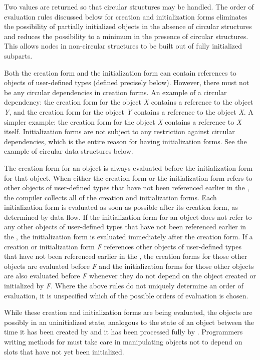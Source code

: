 \begin{newer}
\begin{defun}
  Two values are returned so that circular structures may be handled.
  The order of evaluation rules discussed below
  for creation and initialization forms
  eliminates the possibility of partially initialized objects in the
  absence of circular structures and reduces the possibility to a minimum
  in the presence of circular structures.  This allows nodes in
  non-circular structures to be built out of fully initialized subparts.

  Both the creation form and the initialization form can contain
  references to objects of user-defined types (defined precisely below).
  However, there must not be any circular dependencies in creation forms.
  An example of a circular dependency: the creation form for the
  object \emph{X\/} contains a reference to the object \emph{Y\/}, and the creation form
  for the object \emph{Y\/} contains a reference to the object \emph{X\/}.  A simpler
  example: the creation form for the object \emph{X\/} contains
  a reference to \emph{X\/} itself.  Initialization forms are not subject to
  any restriction against circular dependencies, which is the entire
  reason for having initialization forms.  See the example of circular
  data structures below.

  The creation form for an object is always evaluated before the
  initialization form for that object.  When either the creation form or
  the initialization form refers to other objects of user-defined types
  that have not been referenced earlier in the , the
  compiler collects all of the creation and initialization forms.  Each
  initialization form is evaluated as soon as possible after its
  creation form, as determined by data flow.  If the initialization form
  for an object does not refer to any other objects of user-defined
  types that have not been referenced earlier in the , the
  initialization form is evaluated immediately after the creation form.
  If a creation or initialization form \emph{F\/} references other objects of
  user-defined types that have not been referenced earlier in the
  , the creation forms for those other objects are evaluated
  before \emph{F\/} and the initialization forms for those other objects are
  also evaluated before \emph{F\/} whenever they do not depend on the object
  created or initialized by \emph{F}.  Where the above rules do not uniquely
  determine an order of evaluation, it is unspecified
  which of the possible orders of evaluation is chosen.

  While these creation and initialization forms are being evaluated, the
  objects are possibly in an uninitialized state, analogous to the state
  of an object between the time it has been created by 
  and it has been processed fully by .  Programmers
  writing methods for  must take care in manipulating
  objects not to depend on slots that have not yet been initialized.


\end{defun}
\end{newer}

